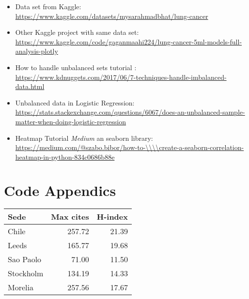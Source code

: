 \documentclass[a4paper,12pt]{article}
\begin{document}
\begin{itemize}
\item\relax [1] Data set from Kaggle: \url{https://www.kaggle.com/datasets/mysarahmadbhat/lung-cancer}

\item\relax [2] Other Kaggle project with same data set: \url{https://www.kaggle.com/code/gaganmaahi224/lung-cancer-5ml-models-full-analysis-plotly}

\item\relax [3] How to handle unbalanced sets tutorial :
\url{https://www.kdnuggets.com/2017/06/7-techniques-handle-imbalanced-data.html}

\item\relax [4] Unbalanced data in Logistic Regression: \url{https://stats.stackexchange.com/questions/6067/does-an-unbalanced-sample-matter-when-doing-logistic-regression}

\item\relax [5] Heatmap Tutorial \emph{Medium} an seaborn library: \url{https://medium.com/@szabo.bibor/how-to-\\\\create-a-seaborn-correlation-heatmap-in-python-834c0686b88e}
\end{itemize}


\section{Code Appendics}
\label{sec:org9d429e0}

\begin{center}
\begin{tabular}{lrr}
Sede & Max cites & H-index\\
\hline
Chile & 257.72 & 21.39\\
Leeds & 165.77 & 19.68\\
Sao Paolo & 71.00 & 11.50\\
Stockholm & 134.19 & 14.33\\
Morelia & 257.56 & 17.67\\
\end{tabular}
\end{center}
\end{document}
